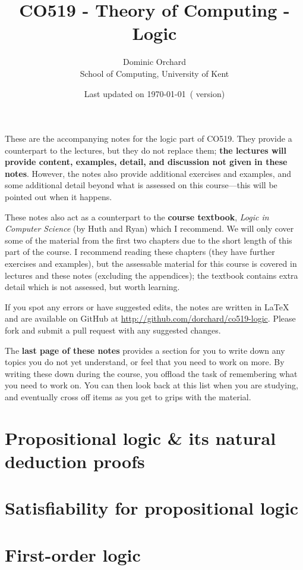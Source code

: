 \documentclass[a4paper]{article}
\title{\vspace{-3em}CO519 - Theory of Computing - Logic}
\author{Dominic Orchard \\
  {\small{School of Computing, University of Kent}}}
\date{Last updated on \today\ {\small{(\version{} version)}}}
\theoremstyle{definition}
\begin{document}
\maketitle

\noindent
These are the accompanying notes for the logic part of CO519. They
provide a counterpart to the lectures, but they do not replace them; \textbf{the
lectures will provide content, examples, detail, and discussion not given in
these notes}.  However, the notes also provide additional exercises and
examples, and some additional detail beyond what is assessed on this
course---this will be pointed out when it happens.

These notes also act as a counterpart to the \textbf{course textbook},
\emph{Logic in Computer Science} (by Huth and Ryan) which I
recommend. We will only cover some of the material from the first two
chapters due to the short length of this part of the course. I
recommend reading these chapters (they have further exercises and
examples), but the assessable material for this course is covered in
lectures and these notes (excluding the appendices); the textbook
contains extra detail which is not assessed, but worth learning.

If you spot any errors or have suggested edits, the notes are written
in LaTeX and are available on GitHub at
\url{http://github.com/dorchard/co519-logic}. Please fork and submit a
pull request with any suggested changes.

The \textbf{last page of these notes} provides a section for you to
write down any topics you do not yet understand, or feel that you need
to work on more. By writing these down during the course, you offload
the task of remembering what you need to work on. You can then look
back at this list when you are studying, and eventually cross off items
as you get to grips with the material.

\part{Propositional logic \& its natural deduction proofs}


\part{Satisfiability for propositional logic}
\setcounter{section}{0}


\part{First-order logic}
\setcounter{section}{0}

\end{document}
